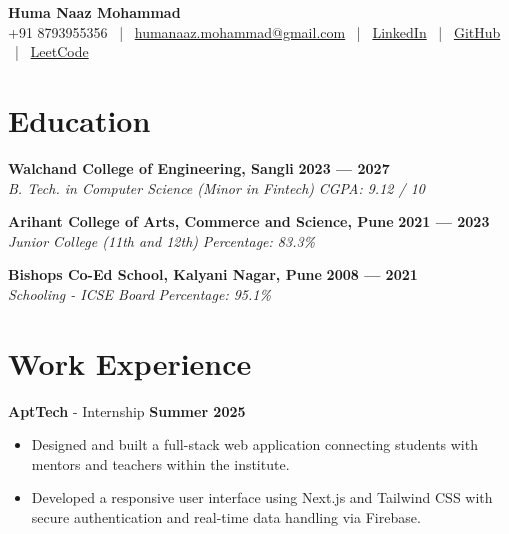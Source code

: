 \documentclass[a4paper, 8pt]{article}
\begin{document}
\begin{center}
    {\Huge\textbf{Huma Naaz Mohammad}}\\
    
    \vspace{2pt}
    +91 8793955356 ~|~ 
    \href{mailto:humanaaz.mohammad@gmail.com}{humanaaz.mohammad@gmail.com} ~|~ 
    \href{https://www.linkedin.com/in/huma-naaz-mohammad-8a6251296/}{LinkedIn} ~|~ 
    \href{https://github.com/naazie}{GitHub} ~|~ 
    \href{https://leetcode.com/humanaaz/}{LeetCode}
\end{center}

\section*{Education}
\textbf{Walchand College of Engineering, Sangli} \hfill \textbf{2023 --- 2027} \\
\textit{B. Tech. in Computer Science (Minor in Fintech)} \hfill \textit{CGPA: 9.12 / 10}

\textbf{Arihant College of Arts, Commerce and Science, Pune} \hfill \textbf{2021 --- 2023} \\
\textit{Junior College (11th and 12th)} \hfill \textit{Percentage: 83.3\%}

\textbf{Bishops Co-Ed School, Kalyani Nagar, Pune} \hfill \textbf{2008 --- 2021} \\
\textit{Schooling - ICSE Board} \hfill \textit{Percentage: 95.1\%}

\section*{Work Experience}
\textbf{AptTech} - Internship \hfill \textbf{Summer 2025}
\begin{itemize}
    \item Designed and built a full-stack web application connecting students with mentors and teachers within the institute.
    \item Developed a responsive user interface using Next.js and Tailwind CSS with secure authentication and real-time data handling via Firebase.
\end{itemize}

\end{document}
